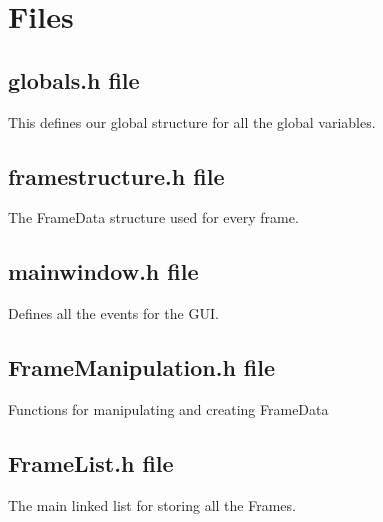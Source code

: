\documentclass[11pt]{article} %
\begin{document}
{\newpage
\section{Files}
%

\subsection{globals.h file}
This defines our global structure for all the global variables.


\newpage
\subsection{framestructure.h file}
The FrameData structure used for every frame.


\newpage
\subsection{mainwindow.h file}
Defines all the events for the GUI.



\newpage
\subsection{FrameManipulation.h file}
Functions for manipulating and creating FrameData

%

\newpage
\subsection{FrameList.h file}
The main linked list for storing all the Frames.

%

}
\end{document}

